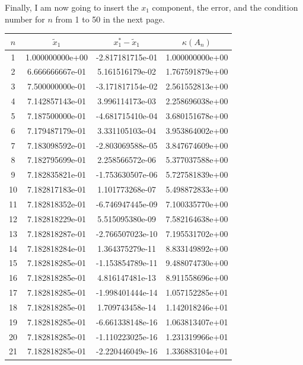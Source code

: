 \documentclass{article}
\begin{document}
Finally, I am now going to insert the $x_1$ component, the error, and the condition number for $n$ from 1 to 50 in the next page.
\begin{table}[htb]
\centering %
\begin{tabular}{c c c c} %
$n$ & $\widetilde{x}_1$ & $x_1^{\ast}- \widetilde{x}_1$ & $\kappa(A_n)$ \\ [0.65ex] %
\hline %
1 & 1.000000000e+00 & -2.817181715e-01 & 1.000000000e+00 \\
2 & 6.666666667e-01 & 5.161516179e-02 & 1.767591879e+00 \\
3 & 7.500000000e-01 & -3.171817154e-02 & 2.561552813e+00 \\
4 & 7.142857143e-01 & 3.996114173e-03 & 2.258696038e+00 \\
5 & 7.187500000e-01 & -4.681715410e-04 & 3.680151678e+00 \\
6 & 7.179487179e-01 & 3.331105103e-04 & 3.953864002e+00 \\
7 & 7.183098592e-01 & -2.803069588e-05 & 3.847674609e+00 \\
8 & 7.182795699e-01 & 2.258566572e-06 & 5.377037588e+00 \\
9 & 7.182835821e-01 & -1.753630507e-06 & 5.727581839e+00 \\
10 & 7.182817183e-01 & 1.101773268e-07 & 5.498872833e+00 \\
11 & 7.182818352e-01 & -6.746947445e-09 & 7.100335770e+00 \\
12 & 7.182818229e-01 & 5.515095380e-09 & 7.582164638e+00 \\
13 & 7.182818287e-01 & -2.766507023e-10 & 7.195531702e+00 \\
14 & 7.182818284e-01 & 1.364375279e-11 & 8.833149892e+00 \\
15 & 7.182818285e-01 & -1.153854789e-11 & 9.488074730e+00 \\
16 & 7.182818285e-01 & 4.816147481e-13 & 8.911558696e+00 \\
17 & 7.182818285e-01 & -1.998401444e-14 & 1.057152285e+01 \\
18 & 7.182818285e-01 & 1.709743458e-14 & 1.142018246e+01 \\
19 & 7.182818285e-01 & -6.661338148e-16 & 1.063813407e+01 \\
20 & 7.182818285e-01 & -1.110223025e-16 & 1.231319966e+01 \\
21 & 7.182818285e-01 & -2.220446049e-16 & 1.336883104e+01 \\

\end{tabular}
\end{table}
\end{document}
